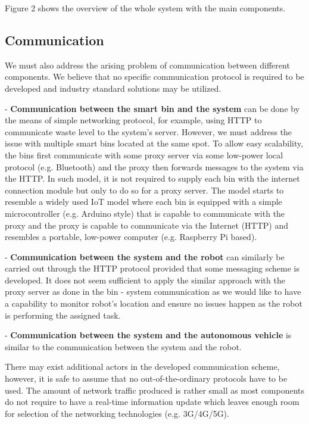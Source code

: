 \documentclass{article}
\begin{document}
Figure 2 shows the overview of the whole system with the main components.

\subsection{Communication}

We must also address the arising problem of communication between different components. We believe
that no specific communication protocol is required to be developed and industry standard solutions
may be utilized.

- \textbf{Communication between the smart bin and the system} can be done by the means of simple
networking protocol, for example, using HTTP to communicate waste level to the system's server.
However, we must address the issue with multiple smart bins located at the same spot. To allow easy
scalability, the bins first communicate with some proxy server via some low-power local protocol
(e.g. Bluetooth) and the proxy then forwards messages to the system via the HTTP. In such model, it
is not required to supply each bin with the internet connection module but only to do so for a proxy
server. The model starts to resemble a widely used IoT model where each bin is equipped with a
simple microcontroller (e.g. Arduino style) that is capable to communicate with the proxy and the
proxy is capable to communicate via the Internet (HTTP) and resembles a portable, low-power computer
(e.g. Raspberry Pi based).

- \textbf{Communication between the system and the robot} can similarly be carried out through the
HTTP protocol provided that some messaging scheme is developed. It does not seem sufficient to apply
the similar approach with the proxy server as done in the bin - system communication as we would
like to have a capability to monitor robot's location and ensure no issues happen as the robot is
performing the assigned task.

- \textbf{Communication between the system and the autonomous vehicle} is similar to the
communication between the system and the robot.

There may exist additional actors in the developed communication scheme, however, it is safe to
assume that no out-of-the-ordinary protocols have to be used. The amount of network traffic produced
is rather small as most components do not require to have a real-time information update which
leaves enough room for selection of the networking technologies (e.g. 3G/4G/5G).
\end{document}
